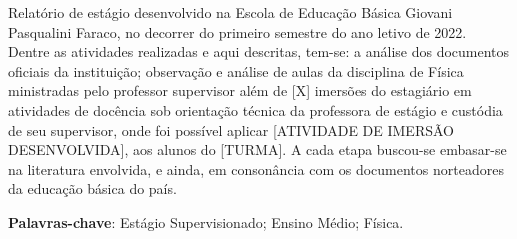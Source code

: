 \begin{resumo}
    Relatório de estágio desenvolvido na Escola de Educação Básica Giovani Pasqualini Faraco, no decorrer do primeiro semestre do ano letivo de 2022. Dentre as atividades realizadas e aqui descritas, tem-se: a análise dos documentos oficiais da instituição; observação e análise de aulas da disciplina de Física ministradas pelo professor supervisor além de [X] imersões do estagiário em atividades de docência sob orientação técnica da professora de estágio e custódia de seu supervisor, onde foi possível aplicar [ATIVIDADE DE IMERSÃO DESENVOLVIDA], aos alunos  do [TURMA]. A cada etapa buscou-se embasar-se na literatura envolvida, e ainda, em consonância com os documentos norteadores da educação básica do país.
    
    \vspace{\onelineskip}
    \noindent

    \textbf{Palavras-chave}: Estágio Supervisionado; Ensino Médio; Física.
\end{resumo}